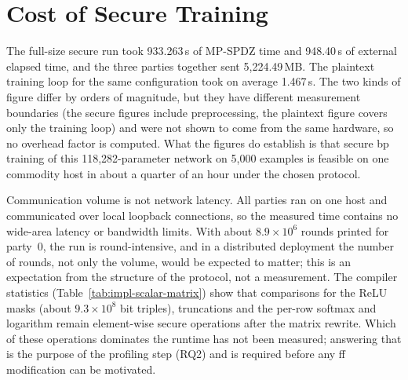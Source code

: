 \section{Cost of Secure Training}\label{sec:disc-cost}
The full-size secure run took 933.263\,s of MP-SPDZ time and 948.40\,s of external elapsed time, and the three parties together sent 5{,}224.49\,MB. The plaintext training loop for the same configuration took on average 1.467\,s. The two kinds of figure differ by orders of magnitude, but they have different measurement boundaries (the secure figures include preprocessing, the plaintext figure covers only the training loop) and were not shown to come from the same hardware, so no overhead factor is computed. What the figures do establish is that secure \ac{bp} training of this 118{,}282-parameter network on 5{,}000 examples is feasible on one commodity host in about a quarter of an hour under the chosen protocol.

Communication volume is not network latency. All parties ran on one host and communicated over local loopback connections, so the measured time contains no wide-area latency or bandwidth limits. With about $8.9\times10^{6}$ rounds printed for party~0, the run is round-intensive, and in a distributed deployment the number of rounds, not only the volume, would be expected to matter; this is an expectation from the structure of the protocol, not a measurement. The compiler statistics (Table~\ref{tab:impl-scalar-matrix}) show that comparisons for the ReLU masks (about $9.3\times10^{8}$ bit triples), truncations and the per-row softmax and logarithm remain element-wise secure operations after the matrix rewrite. Which of these operations dominates the runtime has not been measured; answering that is the purpose of the profiling step (RQ2) and is required before any \ac{ff} modification can be motivated.


